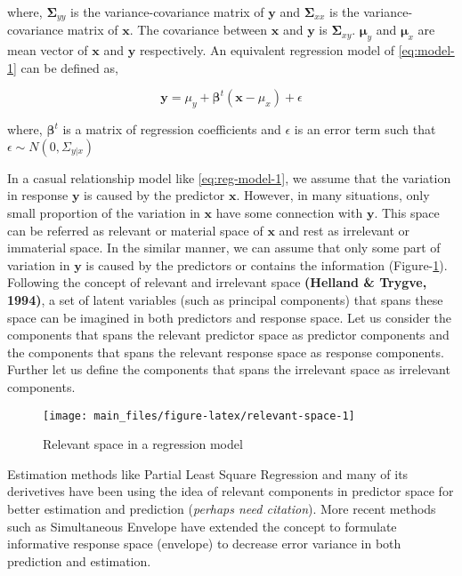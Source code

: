 \documentclass[12pt,3p,authoryear]{elsarticle}
\begin{document}
where, \(\boldsymbol{\Sigma}_{yy}\) is the variance-covariance matrix of
\(\mathbf{y}\) and \(\boldsymbol{\Sigma}_{xx}\) is the
variance-covariance matrix of \(\mathbf{x}\). The covariance between
\(\mathbf{x}\) and \(\mathbf{y}\) is \(\boldsymbol{\Sigma}_{xy}\).
\(\boldsymbol{\mu}_y\) and \(\boldsymbol{\mu}_x\) are mean vector of
\(\mathbf{x}\) and \(\mathbf{y}\) respectively. An equivalent regression
model of \eqref{eq:model-1} can be defined as,

\begin{equation}
\mathbf{y} = \mu_y + \boldsymbol{\beta}^t(\mathbf{x} - \mu_x) + \epsilon
\label{eq:reg-model-1}
\end{equation}

where, \(\boldsymbol{\beta}^t\) is a matrix of regression coefficients
and \(\epsilon\) is an error term such that
\(\epsilon \sim N(0, \Sigma_{y|x})\)

In a casual relationship model like \eqref{eq:reg-model-1}, we assume that
the variation in response \(\mathbf{y}\) is caused by the predictor
\(\mathbf{x}\). However, in many situations, only small proportion of
the variation in \(\mathbf{x}\) have some connection with
\(\mathbf{y}\). This space can be referred as relevant or material space
of \(\mathbf{x}\) and rest as irrelevant or immaterial space. In the
similar manner, we can assume that only some part of variation in
\(\mathbf{y}\) is caused by the predictors or contains the information
(Figure-\ref{fig:relevant-space}). Following the concept of relevant and
irrelevant space \textbf{(Helland \& Trygve, 1994)}, a set of latent
variables (such as principal components) that spans these space can be
imagined in both predictors and response space. Let us consider the
components that spans the relevant predictor space as predictor
components and the components that spans the relevant response space as
response components. Further let us define the components that spans the
irrelevant space as irrelevant components.

\begin{figure}

{\centering \texttt{[image: main\_files/figure-latex/relevant-space-1]} 

}

\caption{Relevant space in a regression model}\label{fig:relevant-space}
\end{figure}

Estimation methods like Partial Least Square Regression and many of its
derivetives have been using the idea of relevant components in predictor
space for better estimation and prediction (\emph{perhaps need
citation}). More recent methods such as Simultaneous Envelope
\citep{cook2015simultaneous} have extended the concept to formulate
informative response space (envelope) to decrease error variance in both
prediction and estimation.
\end{document}
